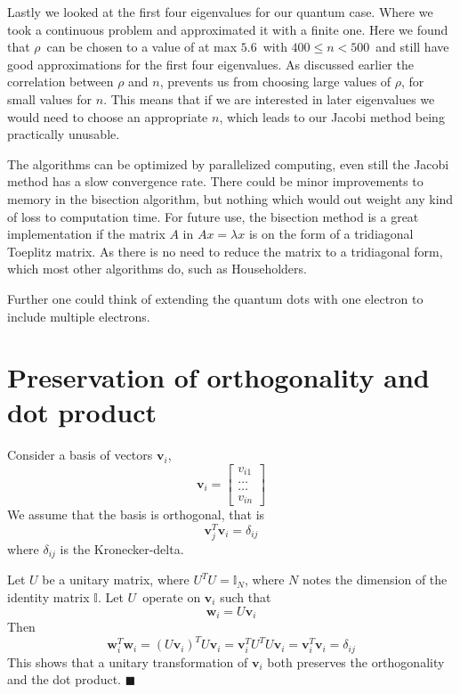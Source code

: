 \documentclass[%
reprint,
nofootinbib,
amsmath,amssymb,
aps,
]{revtex4-1}
\begin{document}
Lastly we looked at the first four eigenvalues for our quantum case. Where we took a continuous problem and approximated it with a finite one. Here we found that $\rho$ can be chosen to a value of at max $5.6$ with $400 \leq n < 500$ and still have good approximations for the first four eigenvalues. As discussed earlier the correlation between $\rho$ and $n$, prevents us from choosing large values of $\rho$, for small values for $n$. This means that if we are interested in later eigenvalues we would need to choose an appropriate $n$, which leads to our Jacobi method being practically unusable. 

The algorithms can be optimized by parallelized computing, even still the Jacobi method has a slow convergence rate. There could be minor improvements to memory in the bisection algorithm, but nothing which would out weight any kind of loss to computation time. For future use, the bisection method is a great implementation if the matrix $A$ in $Ax = \lambda x$ is on the form of a tridiagonal Toeplitz matrix. As there is no need to reduce the matrix to a tridiagonal form, which most other algorithms do, such as Householders\cite{morten}. 

Further one could think of extending the quantum dots with one electron to include multiple electrons.
\appendix %
\section{Preservation of orthogonality and dot product}\label{AppA}%
Consider a basis of vectors $\mathbf{v}_i$, 
\begin{equation}
	\mathbf{v}_i = 
	\begin{bmatrix}
		v_{i1} \\
		\dots\\
		\dots\\
		v_{in}
	\end{bmatrix}
\end{equation}
We assume that the basis is orthogonal, that is 
\begin{equation}
	\mathbf{v}_j^T\mathbf{v}_i = \delta_{ij}
\end{equation}
where $\delta_{ij}$ is the Kronecker-delta.

Let $U$ be a unitary matrix, where $U^{T}U = \mathbb{I}_N$, where $N$ notes the dimension of the identity matrix $\mathbb{I}$.
Let $U$ operate on $\mathbf{v}_i$ such that 
\begin{equation}
	\mathbf{w}_i = U\mathbf{v}_i
\end{equation}
Then 
\begin{equation}
	\mathbf{w}_i^{T}\mathbf{w}_i = \left(U\mathbf{v}_i\right)^{T}U\mathbf{v}_i = \mathbf{v}_i^{T}U^{T}U\mathbf{v}_i = \mathbf{v}_i^{T}\mathbf{v}_i = \delta_{ij}
\end{equation}
 This shows that a unitary transformation of $\mathbf{v}_i$ both preserves the orthogonality and the dot product. $\blacksquare$
\end{document}
